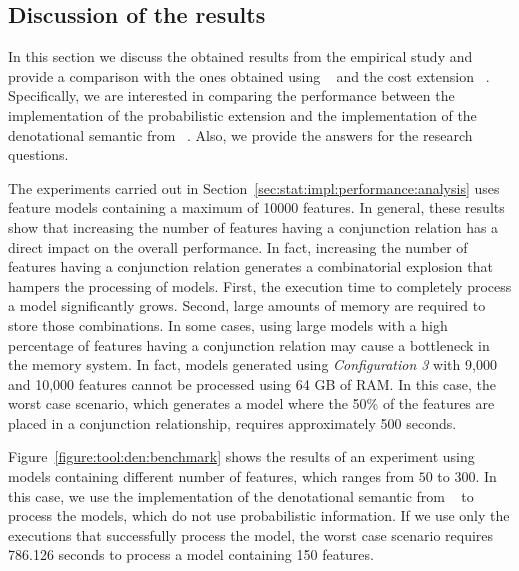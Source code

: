 
\subsection{Discussion of the results}
\label{sec:stat:impl:comp}

In this section we discuss the obtained results from the empirical study and
provide a comparison with the ones obtained using \fodaPA~\cite{acl13}
and the cost extension \fodaPAc~\cite{clc16}. Specifically, we are interested in
comparing the performance between the implementation of the probabilistic
extension and the implementation of the denotational semantic from
\fodaPA~\cite{acl13}. Also, we provide the answers for the research questions.

The experiments carried out in Section~\ref{sec:stat:impl:performance:analysis}
uses feature models containing a maximum of 10000 features. In general,
these results show that increasing the number of features having a conjunction relation
has a direct impact on the overall performance. In fact, increasing the number of features having
a conjunction relation generates a combinatorial explosion that hampers the processing of models.
First, the execution time to completely process a model significantly grows. Second, large amounts
of memory are required to store those combinations. In some cases, using large models with a high
percentage of features having a conjunction relation may cause a bottleneck in the memory system.
In fact, models generated using \textit{Configuration 3} with 9,000 and 10,000 features cannot be
processed using 64 GB of RAM. In this case,
the worst case scenario, which generates a model where the 50\% of the features are
placed in a conjunction relationship, requires approximately 500 seconds.

Figure~\ref{figure:tool:den:benchmark} shows the results of an experiment using
models containing different number of features, which ranges from $50$ to $300$.
In this case, we use the implementation of the denotational semantic from
\fodaPA~\cite{acl13} to process the models, which do not use probabilistic
information. If we use only the executions that successfully process the model,
the worst case scenario requires 786.126 seconds to process a model containing 150
features.

